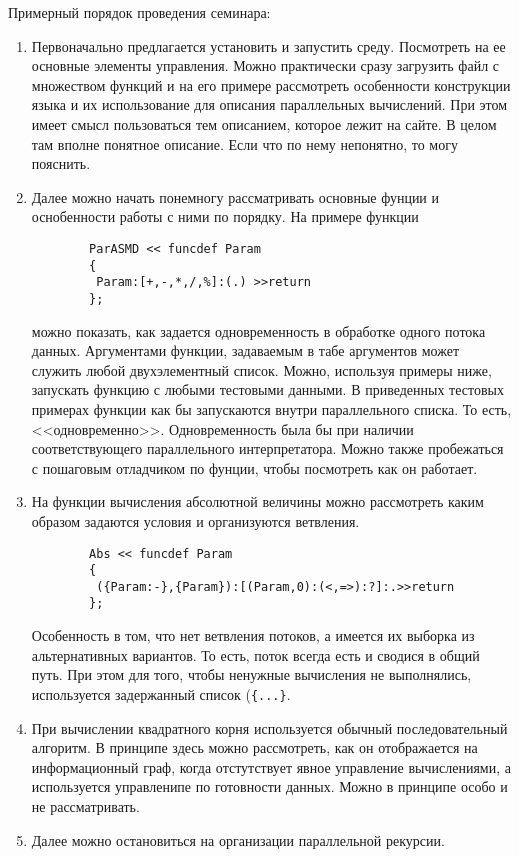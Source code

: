 Примерный порядок проведения семинара:
\begin{enumerate}
    \item Первоначально предлагается установить и запустить среду. Посмотреть на ее основные элементы управления. Можно практически сразу загрузить файл с множеством функций и на его примере рассмотреть особенности конструкции языка и их использование для описания параллельных вычислений. При этом имеет смысл пользоваться тем описанием, которое лежит на сайте. В целом там вполне понятное описание. Если что по нему непонятно, то могу пояснить.
    \item Далее можно начать понемногу рассматривать основные фунции и оснобенности работы с ними по порядку. На примере функции
    \begin{verbatim}
        ParASMD << funcdef Param
        {
         Param:[+,-,*,/,%]:(.) >>return
        };
    \end{verbatim}
    можно показать, как задается одновременность в обработке одного потока данных. Аргументами функции, задаваемым в табе аргументов может служить любой двухэлементный список. Можно, используя примеры ниже, запускать функцию с любыми тестовыми данными. В приведенных тестовых примерах функции как бы запускаются внутри параллельного списка. То есть, <<одновременно>>. Одновременность была бы при наличии соответствующего параллельного интерпретатора. Можно также пробежаться с пошаговым отладчиком по фунции, чтобы посмотреть как он работает.
    \item На функции вычисления абсолютной величины можно рассмотреть каким образом задаются условия и организуются ветвления.
    \begin{verbatim}
        Abs << funcdef Param
        {
         ({Param:-},{Param}):[(Param,0):(<,=>):?]:.>>return
        };
   \end{verbatim}
   Особенность в том, что нет ветвления потоков, а имеется их выборка из альтернативных вариантов. То есть, поток всегда есть и сводися в общий путь. При этом для того, чтобы ненужные вычисления не выполнялись, используется задержанный список (\verb|{...}|.
   \item При вычислении квадратного корня используется обычный последовательный алгоритм. В принципе здесь можно рассмотреть, как он отображается на информационный граф, когда отстутствует явное управление вычислениями, а используется управленипе по готовности данных. Можно в принципе особо и не рассматривать.
   \item Далее можно остановиться на организации параллельной рекурсии.

\end{enumerate}
